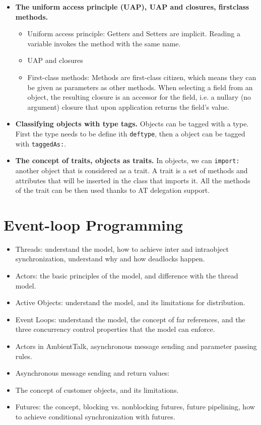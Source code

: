 \documentclass[a4paper]{report}
\begin{document}
\begin{itemize}
  \item \textbf{The uniform access principle (UAP), UAP and closures, firstclass methods.}
  \begin{itemize}
    \item Uniform access principle: Getters and Setters are implicit. Reading a variable invokes the method with the same name.
    \item UAP and closures \todo{}
    \item First-class methods: Methods are first-class citizen, which means they can be given as parameters as other methods. When selecting a field from an object, the resulting closure is an accessor for the field, i.e. a nullary (no argument) closure that upon application returns the field’s value.
  \end{itemize}
  \item \textbf{Classifying objects with type tags.}
  Objects can be tagged with a type. First the type needs to be define ith \texttt{deftype}, then a object can be tagged with \texttt{taggedAs:}.

  \item \textbf{The concept of traits, objects as traits.}
  In objects, we can \texttt{import:} another object that is considered as a trait. A trait is a set of methods and attributes that will be inserted in the class that imports it. All the methods of the trait can be then used thanks to AT delegation support.

\end{itemize}




\chapter{Event-loop Programming}
\begin{itemize}
  \item Threads: understand the model, how to achieve inter and intraobject synchronization,
  understand why and how deadlocks happen.
  \item Actors: the basic principles of the model, and difference with the thread model.
  \item Active Objects: understand the model, and its limitations for distribution.
  \item Event Loops: understand the model, the concept of far references, and the three
  concurrency control properties that the model can enforce.
  \item Actors in AmbientTalk, asynchronous message sending and parameter passing rules.
  \item Asynchronous message sending and return values:
  \item The concept of customer objects, and its limitations.
  \item Futures: the concept, blocking vs. nonblocking futures, future pipelining, how to
  achieve conditional synchronization with futures.
\end{itemize}
\end{document}
